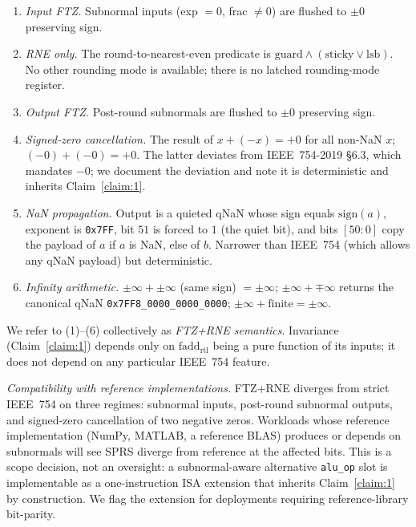 \documentclass[journal,10pt]{IEEEtran}
\theoremstyle{plain}
\theoremstyle{definition}
\theoremstyle{remark}
\newcommand{\fadd}{\ensuremath{\mathrm{fadd}_{\mathrm{rtl}}}}
\newcommand{\sprs}{\textsc{SPRS}}
\newcommand{\sv}[1]{\texttt{#1}}
\begin{document}
\begin{enumerate}
\item \emph{Input FTZ.} Subnormal inputs (exp $= 0$, frac $\neq 0$) are
      flushed to $\pm 0$ preserving sign.
\item \emph{RNE only.} The round-to-nearest-even predicate is
      $\mathrm{guard} \wedge (\mathrm{sticky} \vee \mathrm{lsb})$.
      No other rounding mode is available; there is no latched
      rounding-mode register.
\item \emph{Output FTZ.} Post-round subnormals are flushed to $\pm 0$
      preserving sign.
\item \emph{Signed-zero cancellation.} The result of $x + (-x) = +0$ for
      all non-NaN $x$; $(-0) + (-0) = +0$. The latter deviates from
      IEEE~754-2019 \S6.3, which mandates $-0$; we document the deviation
      and note it is deterministic and inherits Claim~\ref{claim:1}.
\item \emph{NaN propagation.} Output is a quieted qNaN whose sign equals
      $\mathrm{sign}(a)$, exponent is \sv{0x7FF}, bit $51$ is forced to
      $1$ (the quiet bit), and bits $[50{:}0]$ copy the payload of $a$ if
      $a$ is NaN, else of $b$. Narrower than IEEE~754 (which allows any
      qNaN payload) but deterministic.
\item \emph{Infinity arithmetic.} $\pm\infty + \pm\infty$ (same sign) $= \pm\infty$;
      $\pm\infty + \mp\infty$ returns the canonical qNaN
      \sv{0x7FF8\_0000\_0000\_0000};
      $\pm\infty + \text{finite} = \pm\infty$.
\end{enumerate}

We refer to (1)--(6) collectively as \emph{FTZ+RNE semantics}. Invariance
(Claim~\ref{claim:1}) depends only on $\fadd$ being a pure function of
its inputs; it does not depend on any particular IEEE~754 feature.

\emph{Compatibility with reference implementations.} FTZ+RNE diverges
from strict IEEE~754 on three regimes: subnormal inputs, post-round
subnormal outputs, and signed-zero cancellation of two negative zeros.
Workloads whose reference implementation (NumPy, MATLAB, a reference
BLAS) produces or depends on subnormals will see \sprs{} diverge from
reference at the affected bits. This is a scope decision, not an
oversight: a subnormal-aware alternative \sv{alu\_op} slot is
implementable as a one-instruction ISA extension that inherits
Claim~\ref{claim:1} by construction. We flag the extension for
deployments requiring reference-library bit-parity.
\end{document}
